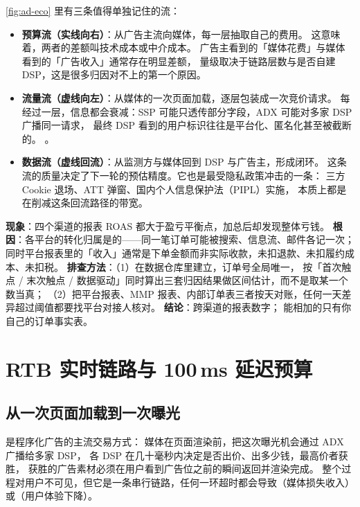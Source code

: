\cref{fig:ad-eco} 里有三条值得单独记住的流：

\begin{itemize}
  \item \textbf{预算流（实线向右）}：从广告主流向媒体，每一层抽取自己的费用。
        这意味着，两者的差额叫技术成本或中介成本。
        广告主看到的「媒体花费」与媒体看到的「广告收入」通常存在明显差额，
        量级取决于链路层数与是否自建 DSP，这是很多归因对不上的第一个原因。
  \item \textbf{流量流（虚线向左）}：从媒体的一次页面加载，逐层包装成一次竞价请求。
        每经过一层，信息都会衰减：SSP 可能只透传部分字段，ADX 可能对多家 DSP 广播同一请求，
        最终 DSP 看到的用户标识往往是平台化、匿名化甚至被截断的。
        。
  \item \textbf{数据流（虚线回流）}：从监测方与媒体回到 DSP 与广告主，形成闭环。
        这条流的质量决定了下一轮的预估精度。它也是最受隐私政策冲击的一条：
        三方 Cookie 退场、ATT 弹窗、国内个人信息保护法（PIPL）实施，
        本质上都是在削减这条回流路径的带宽。
\end{itemize}

\begin{pitfall}
\textbf{现象}：四个渠道的报表 ROAS 都大于盈亏平衡点，加总后却发现整体亏钱。
\textbf{根因}：各平台的转化归属是的——同一笔订单可能被搜索、信息流、邮件各记一次；
同时平台报表里的「收入」通常是下单金额而非实际收款，未扣退款、未扣履约成本、未扣税。
\textbf{排查方法}：（1）在数据仓库里建立，订单号全局唯一，
按「首次触点 / 末次触点 / 数据驱动」同时算出三套归因结果做区间估计，而不是取某一个数当真；
（2）把平台报表、MMP 报表、内部订单表三者按天对账，任何一天差异超过阈值都要找平台对接人核对。
\textbf{结论}：跨渠道的报表数字；
能相加的只有你自己的订单事实表。
\end{pitfall}

\section{RTB 实时链路与 100\,ms 延迟预算}

\subsection{从一次页面加载到一次曝光}

 是程序化广告的主流交易方式：
媒体在页面渲染前，把这次曝光机会通过 ADX 广播给多家 DSP，
各 DSP 在几十毫秒内决定是否出价、出多少钱，最高价者获胜，
获胜的广告素材必须在用户看到广告位之前的瞬间返回并渲染完成。
整个过程对用户不可见，但它是一条串行链路，任何一环超时都会导致（媒体损失收入）
或（用户体验下降）。

